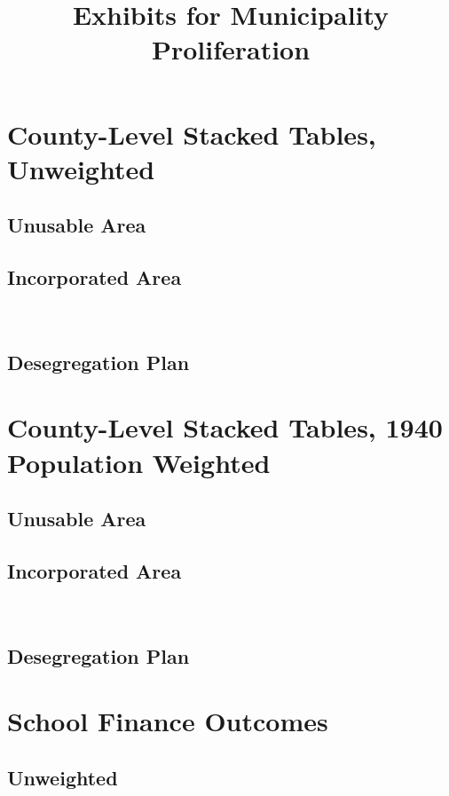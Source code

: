 \documentclass{article}
\title{Exhibits for Municipality Proliferation}
\begin{document}
\maketitle
\tableofcontents
{\footnotesize 
\listoffigures
\listoftables}
\clearpage

\section{County-Level Stacked Tables, Unweighted}
\subsection{Unusable Area}

\clearpage
\subsection{Incorporated Area}

\clearpage\
\subsection{Desegregation Plan}

\clearpage
\section{County-Level Stacked Tables, 1940 Population Weighted}
\subsection{Unusable Area}

\clearpage
\subsection{Incorporated Area}

\clearpage\
\subsection{Desegregation Plan}

\clearpage

\section{School Finance Outcomes}
\subsection{Unweighted}


\clearpage
\end{document}
